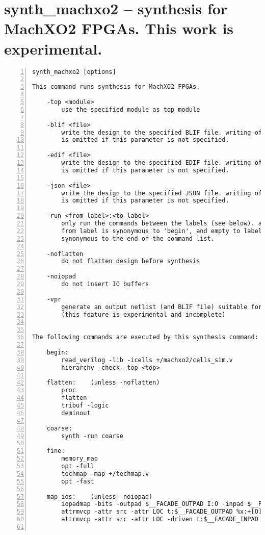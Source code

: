 \section{synth\_machxo2 -- synthesis for MachXO2 FPGAs. This work is experimental.}
\label{cmd:synth_machxo2}
\begin{lstlisting}[numbers=left,frame=single]
    synth_machxo2 [options]

This command runs synthesis for MachXO2 FPGAs.

    -top <module>
        use the specified module as top module

    -blif <file>
        write the design to the specified BLIF file. writing of an output file
        is omitted if this parameter is not specified.

    -edif <file>
        write the design to the specified EDIF file. writing of an output file
        is omitted if this parameter is not specified.

    -json <file>
        write the design to the specified JSON file. writing of an output file
        is omitted if this parameter is not specified.

    -run <from_label>:<to_label>
        only run the commands between the labels (see below). an empty
        from label is synonymous to 'begin', and empty to label is
        synonymous to the end of the command list.

    -noflatten
        do not flatten design before synthesis

    -noiopad
        do not insert IO buffers

    -vpr
        generate an output netlist (and BLIF file) suitable for VPR
        (this feature is experimental and incomplete)


The following commands are executed by this synthesis command:

    begin:
        read_verilog -lib -icells +/machxo2/cells_sim.v
        hierarchy -check -top <top>

    flatten:    (unless -noflatten)
        proc
        flatten
        tribuf -logic
        deminout

    coarse:
        synth -run coarse

    fine:
        memory_map
        opt -full
        techmap -map +/techmap.v
        opt -fast

    map_ios:    (unless -noiopad)
        iopadmap -bits -outpad $__FACADE_OUTPAD I:O -inpad $__FACADE_INPAD O:I -toutpad $__FACADE_TOUTPAD ~T:I:O -tinoutpad $__FACADE_TINOUTPAD ~T:O:I:B A:top
        attrmvcp -attr src -attr LOC t:$__FACADE_OUTPAD %x:+[O] t:$__FACADE_TOUTPAD %x:+[O] t:$__FACADE_TINOUTPAD %x:+[B]
        attrmvcp -attr src -attr LOC -driven t:$__FACADE_INPAD %x:+[I]


\end{lstlisting}
